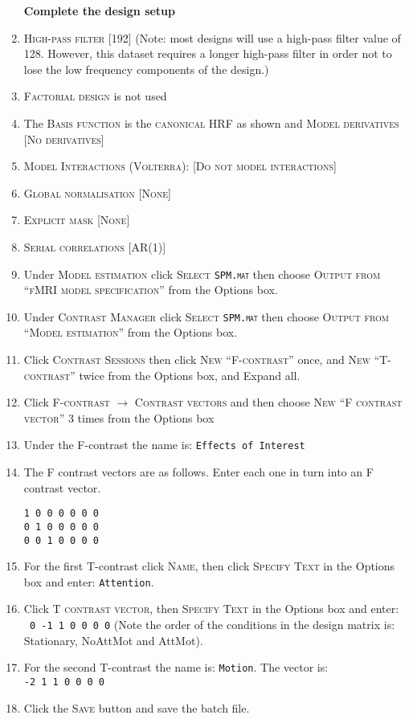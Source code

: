 \begin{enumerate}
\textbf{Complete the design setup}\\
\item \textsc{High-pass filter} [192] (Note: most designs will use a high-pass filter value of 128. However, this dataset requires a longer high-pass filter in order not to lose the low frequency components of the design.)
\item \textsc{Factorial design} is not used
\item The \textsc{Basis function} is the \textsc{canonical HRF} as shown and \textsc{Model derivatives} [\textsc{No derivatives}]
\item \textsc{Model Interactions (Volterra)}: [\textsc{Do not model interactions}]
\item \textsc{Global normalisation} [\textsc{None}]
\item \textsc{Explicit mask} [\textsc{None}]
\item \textsc{Serial correlations} [\textsc{AR(1)}]
\item Under \textsc{Model estimation} click \textsc{Select \texttt{SPM.mat}} then choose \textsc{Output from ``fMRI model specification''} from the Options box.
\item Under \textsc{Contrast Manager} click \textsc{Select \texttt{SPM.mat}} then choose \textsc{Output from ``Model estimation''} from the Options box.
\item Click \textsc{Contrast Sessions} then click \textsc{New ``F-contrast''} once, and \textsc{New ``T-contrast''} twice from the Options box, and Expand all.
\item Click \textsc{F-contrast} $\rightarrow$ \textsc{Contrast vectors} and then choose \textsc{New ``F contrast vector''} 3 times from the Options box
\item Under the F-contrast the name is: \texttt{Effects of Interest}
\item The F contrast vectors are as follows.
Enter each one in turn into an F contrast vector.
\begin{verbatim}
1 0 0 0 0 0 0
0 1 0 0 0 0 0
0 0 1 0 0 0 0
\end{verbatim}
\item For the first T-contrast click \textsc{Name}, then click \textsc{Specify Text} in the Options box and enter: \texttt{Attention}.
\item Click \textsc{T contrast vector}, then \textsc{Specify Text} in the Options box and enter: \texttt{~0~-1~1~0~0~0~0} (Note the order of the conditions in the design matrix is: Stationary, NoAttMot and AttMot).
\item For the second T-contrast the name is: \texttt{Motion}. The vector is: \texttt{-2~1~1~0~0~0~0}
\item Click the \textsc{Save} button and save the batch file.\\


\end{enumerate}
